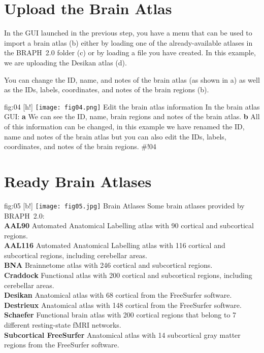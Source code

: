 \documentclass[justified]{tufte-handout}
\begin{document}
\clearpage
\section{Upload the Brain Atlas}

In the GUI launched in the previous step, you have a menu that can be used to import a brain atlas (b) either by loading one of the already-available atlases in the BRAPH~2.0 folder  (c) or by loading a file you have created. In this example, we are uploading the Desikan atlas (d).

You can change the ID, name, and notes of the brain atlas (as shown in a) as well as the IDs, labels, coordinates, and notes of the brain regions (b).
	
	{fig:04}
	{
	[h!]
	\texttt{[image: fig04.png]}
	}
	{Edit the brain atlas information}
	{
	In the brain atlas GUI: 
	{\bf a} We can see the ID, name, brain regions and notes of the brain atlas.
	{\bf b} All of this information can be changed, in this example we have renamed the ID, name and notes of the brain atlas but you can also edit the IDs, labels, coordinates, and notes of the brain regions.
	}
#!04

\section{Ready Brain Atlases}

	{fig:05}
	{
	[b!]
	\texttt{[image: fig05.jpg]}
	}
	{Brain Atlases}
	{
	Some brain atlases provided by BRAPH~2.0: \\
	{\bf AAL90} Automated Anatomical Labelling atlas with 90 cortical and subcortical regions.\\
	{\bf AAL116} Automated Anatomical Labelling atlas with 116 cortical and subcortical regions, including cerebellar areas.\\
	{\bf BNA} Brainnetome atlas with 246 cortical and subcortical regions.\\
	{\bf Craddock} Functional atlas with 200 cortical and subcortical regions, including cerebellar areas.\\
	{\bf Desikan} Anatomical atlas with 68 cortical from the FreeSurfer software.\\
	{\bf Destrieux} Anatomical atlas with 148 cortical from the FreeSurfer software.\\
	{\bf Schaefer} Functional brain atlas with 200 cortical regions that belong to 7 different resting-state fMRI networks.\\
	{\bf Subcortical FreeSurfer} Anatomical atlas with 14 subcortical gray matter regions from the FreeSurfer software.
	}
\end{document}
